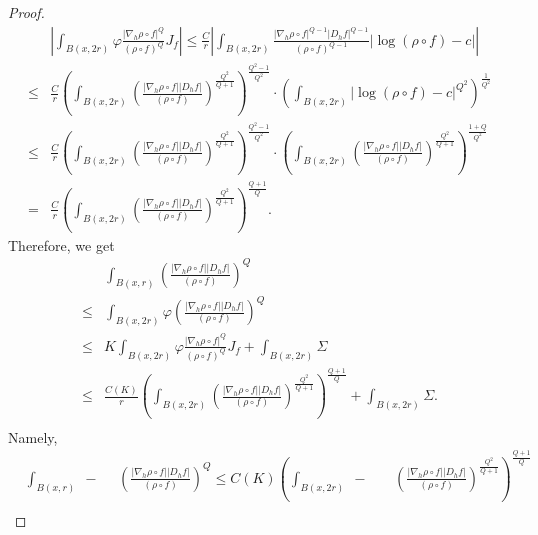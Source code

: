 \documentclass[11pt,twoside]{article}
\theoremstyle{definition}
\theoremstyle{remark}
\newcommand{\abs}[1]{\left|#1\right|}
\begin{document}
\begin{proof}
\begin{equation}
\begin{aligned}
&\abs{\int_{B(x,2r)}\varphi\frac{\vert\nabla_{h}\rho\circ f\vert^{Q}}{(\rho\circ f)^{Q}}J_{f}} \leq\frac{C}{r}\abs{\int_{B(x,2r)}\frac{\vert\nabla_{h}\rho\circ f\vert^{Q-1}\vert D_{h}f\vert^{Q-1}}{(\rho\circ f)^{Q-1}} \vert\log(\rho\circ f)-c\vert}\\
\leq& 
\frac{C}{r}\left(\int_{B(x,2r)}\left(\frac{\vert\nabla_{h}\rho\circ f\vert\vert D_{h}f\vert}{(\rho\circ f)}\right)^{\frac{Q^{2}}{Q+1}}\right)^{\frac{Q^{2}-1}{Q^{2}}} 
\cdot\left(\int_{B(x,2r)}\vert\log(\rho\circ f)-c\vert^{Q^{2}}\right)^{\frac{1}{Q^{2}}}\\
\leq& 
\frac{C}{r}\left(\int_{B(x,2r)}\left(\frac{\vert\nabla_{h}\rho\circ f\vert\vert D_{h}f\vert}{(\rho\circ f)}\right)^{\frac{Q^{2}}{Q+1}}\right)^{\frac{Q^{2}-1}{Q^{2}}} 
\cdot\left(\int_{B(x,2r)}\left(\frac{\vert\nabla_{h}\rho\circ f\vert\vert D_{h}f\vert}{(\rho\circ f)}\right)^{\frac{Q^{2}}{Q+1}}\right)^{\frac{1+Q}{Q^{2}}}\\
 =& 
\frac{C}{r}\left(\int_{B(x,2r)}\left(\frac{\vert\nabla_{h}\rho\circ f\vert\vert D_{h}f\vert}{(\rho\circ f)}\right)^{\frac{Q^{2}}{Q+1}}\right)^{\frac{Q+1}{Q}}.
\end{aligned}
\end{equation}
Therefore, we get 
\begin{equation}
\begin{aligned}
&\int_{B(x,r)}\left(\frac{\vert\nabla_{h}\rho\circ f\vert\vert D_{h}f\vert}{(\rho\circ f)}\right)^{Q}\\
\leq& \int_{B(x,2r)}\varphi\left(\frac{\vert\nabla_{h}\rho\circ f\vert\vert D_{h}f\vert}{(\rho\circ f)}\right)^{Q}\\
\leq& K\int_{B(x,2r)}\varphi\frac{\vert\nabla_{h}\rho\circ f\vert^{Q}}{(\rho\circ f)^{Q}}J_{f}+\int_{B(x,2r)}\Sigma\\
\leq& 
\frac{C(K)}{r}\left(\int_{B(x,2r)}\left(\frac{\vert\nabla_{h}\rho\circ f\vert\vert D_{h}f\vert}{(\rho\circ f)}\right)^{\frac{Q^{2}}{Q+1}}\right)^{\frac{Q+1}{Q}}+\int_{B(x,2r)}\Sigma.\\
\end{aligned}
\end{equation}
Namely,
\begin{equation}\label{e14}
\begin{aligned}
&\int_{B(x,r)}\!\!\!\!\!\!\!\!\!\!\!\!\!\!\!\!\!\!\!\!\; {}-{} \,\,\,\,\,\,\,\,\left(\frac{\vert\nabla_{h}\rho\circ f\vert\vert D_{h}f\vert}{(\rho\circ f)}\right)^{Q}\leq C(K)\left(\int_{B(x,2r)}\!\!\!\!\!\!\!\!\!\!\!\!\!\!\!\!\!\!\!\!\!\!\!\; {}-{} \,\,\,\,\,\,\,\,\,\,\,\left(\frac{\vert\nabla_{h}\rho\circ f\vert\vert D_{h}f\vert}{(\rho\circ f)}\right)^{\frac{Q^{2}}{Q+1}}\right)^{\frac{Q+1}{Q}}\\

\end{aligned}
\end{equation}
\end{proof}
\end{document}
